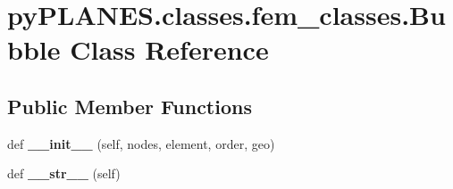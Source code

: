 \hypertarget{classpy_p_l_a_n_e_s_1_1classes_1_1fem__classes_1_1_bubble}{}\section{py\+P\+L\+A\+N\+E\+S.\+classes.\+fem\+\_\+classes.\+Bubble Class Reference}
\label{classpy_p_l_a_n_e_s_1_1classes_1_1fem__classes_1_1_bubble}
\subsection*{Public Member Functions}
\begin{DoxyCompactItemize}
\item 
\mbox{\label{classpy_p_l_a_n_e_s_1_1classes_1_1fem__classes_1_1_bubble_a5a46e58232392d5bd854faa72f0099a7}} 
def {\bfseries \+\_\+\+\_\+init\+\_\+\+\_\+} (self, nodes, element, order, geo)
\item 
\mbox{\label{classpy_p_l_a_n_e_s_1_1classes_1_1fem__classes_1_1_bubble_a9e30ccc9fd9a0cf214671a9c2991c21d}} 
def {\bfseries \+\_\+\+\_\+str\+\_\+\+\_\+} (self)
\end{DoxyCompactItemize}

